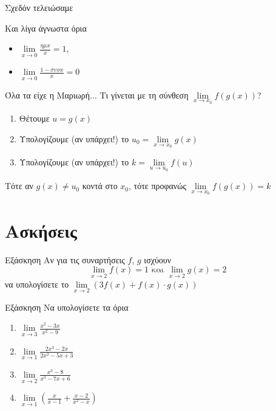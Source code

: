 \documentclass[greek]{beamer}
\begin{document}
\begin{frame}{Σχεδόν τελειώσαμε}
 \begin{block}{Και λίγα άγνωστα όρια}
  \begin{itemize}
   \item $\lim\limits_{x \to 0}{ \frac{ημx}{x} }=1$, \pause
   \item $\lim\limits_{x \to 0}{ \frac{1-συνx}{x} }=0$
  \end{itemize}
 \end{block}
\end{frame}

\begin{frame}{Όλα τα είχε η Μαριωρή...}
 Τι γίνεται με τη σύνθεση  $\lim\limits_{x \to x_0}{ f(g(x))}$? \pause
 \begin{enumerate}
  \item Θέτουμε $u=g(x)$ \pause
  \item Υπολογίζουμε (αν υπάρχει!) το $u_0=\lim\limits_{x \to x_0}{ g(x)}$ \pause
  \item Υπολογίζουμε (αν υπάρχει!) το $k=\lim\limits_{u \to u_0}{ f(u)}$ \pause
 \end{enumerate}
 Τότε αν $g(x)\ne u_0$ κοντά στο $x_0$, τότε προφανώς $\lim\limits_{x \to x_0}{ f(g(x))}=k$
\end{frame}

\section{Ασκήσεις}
\begin{frame}{Εξάσκηση}
 Αν για τις συναρτήσεις $f$, $g$ ισχύουν
 $$\lim\limits_{x \to 2}{ f(x) }=1 \text{ και } \lim\limits_{ x \to 2}{ g(x) }=2$$
 να υπολογίσετε το $\lim\limits_{x \to 2}{ (3f(x)+f(x)\cdot g(x)) }$
\end{frame}

\begin{frame}{Εξάσκηση}
 Να υπολογίσετε τα όρια
 \begin{enumerate}
  \item $\lim\limits_{x \to 3}{ \frac{x^2-3x}{x^2-9} }$ \pause
  \item $\lim\limits_{x \to 1}{ \frac{2x^3-2x}{2x^2-5x+3} }$ \pause
  \item $\lim\limits_{x \to 2}{ \frac{x^3-8}{x^3-7x+6} }$ \pause
  \item $\lim\limits_{x \to 1}{ \left( \frac{x}{x-1}+\frac{x-2}{x^2-x}  \right)  }$
 \end{enumerate}
\end{frame}
\end{document}
